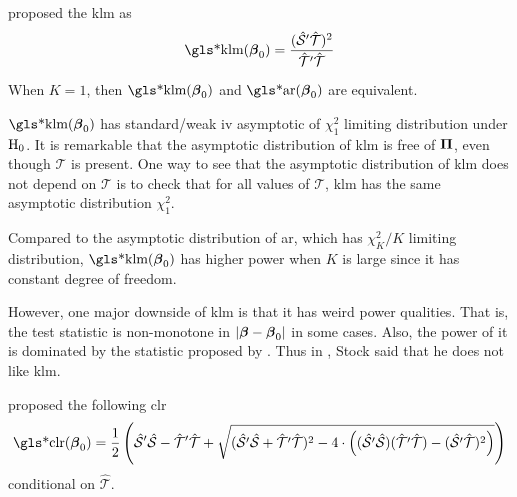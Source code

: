 \documentclass[a4paper]{article}
\begin{document}
\begin{definition}
	\textcite{kleibergen-2002} proposed the \gls*{klm} as
	\begin{align*}
		\text{\gls*{klm}}(\bbeta_0) = \frac{ ( \hat{\mathcal{S}}\T\hat{\mathcal{T}} )^2 }{ \hat{\mathcal{T}}\T\hat{\mathcal{T}} }
	\end{align*}
\end{definition}

\begin{remark}
	When $K=1$, then $\text{\gls*{klm}}(\bbeta_0)$ and $\text{\gls*{ar}}(\bbeta_0)$ are equivalent.
\end{remark}

\begin{remark}
	$\text{\gls*{klm}}(\bbeta_0)$ has
	standard/weak \gls*{iv} asymptotic of $\chi_{1}^2$ limiting distribution under $\mathrm{H}_0$.
	It is remarkable that the asymptotic distribution of \gls*{klm} is free of $\boldsymbol{\Pi}$,
	even though $\mathcal{T}$ is present.
	One way to see that the asymptotic distribution of \gls*{klm} does not depend on $\mathcal{T}$ is to check that
	for all values of $\mathcal{T}$, \gls*{klm} has the same asymptotic distribution $\chi^2_1$.
\end{remark}

\begin{remark}
	Compared to the asymptotic distribution of \gls*{ar},
	which has $\chi_{K}^2/K$ limiting distribution,
	$\text{\gls*{klm}}(\bbeta_0)$ has higher power when $K$ is large since it has constant degree of freedom.
\end{remark}

\begin{remark}
	However, one major downside of \gls*{klm} is that it has weird power qualities.
	That is, the test statistic is non-monotone in $|\boldsymbol{\beta}-\boldsymbol{\beta}_0|$ in some cases.
	Also, the power of it is dominated by the statistic proposed by \textcite{moreira-2002}.
	Thus in \textcite{stock-2008}, Stock said that he does not like \gls*{klm}.
\end{remark}

\begin{definition}
	\textcite{moreira-2002} proposed the following \gls*{clr}
	\begin{align*}
		\text{\gls*{clr}}(\bbeta_0) = \frac12
		\left(
		\hat{\mathcal{S}}\T\hat{\mathcal{S}}
		- \hat{\mathcal{T}}\T\hat{\mathcal{T}}
		+
		\sqrt{
		( \hat{\mathcal{S}}\T\hat{\mathcal{S}} + \hat{\mathcal{T}}\T\hat{\mathcal{T}} )^2
		- 4 \cdot
		\left(
		(\hat{\mathcal{S}}\T\hat{\mathcal{S}}) (\hat{\mathcal{T}}\T\hat{\mathcal{T}})
		- (\hat{\mathcal{S}}\T\hat{\mathcal{T}})^2
		\right)
		}
		\right)
	\end{align*}
	conditional on $\hat{\mathcal{T}}$.
\end{definition}
\end{document}
